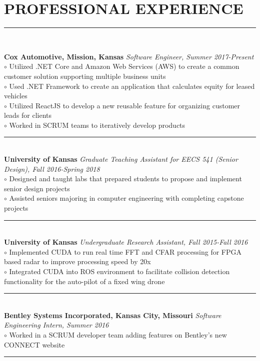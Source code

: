 \documentclass[twoside]{article}
\begin{document}
\section*{PROFESSIONAL EXPERIENCE}
\vspace{-1em}
\rule{\textwidth}{1pt}\\
\begin{adjustwidth}{0.2in}{0in}
\vspace{-1em}
\textbf{Cox Automotive, Mission, Kansas} \hfill \textit{Software Engineer, Summer 2017-Present}\\
$\circ$ Utilized .NET Core and Amazon Web Services (AWS) to create a common customer solution supporting multiple business units\\
$\circ$ Used .NET Framework to create an application that calculates equity for leased vehicles\\
$\circ$ Utilized ReactJS to develop a new reusable feature for organizing customer leads for clients\\
$\circ$ Worked in SCRUM teams to iteratively develop products\\
\rule{7.3in}{0.5pt}\\
\textbf{University of Kansas} \hfill \textit{Graduate Teaching Assistant for EECS 541 (Senior Design), Fall 2016-Spring 2018}\\
$\circ$ Designed and taught labs that prepared students to propose and implement senior design projects\\
$\circ$ Assisted seniors majoring in computer engineering with completing capstone projects\\
\rule{7.3in}{0.5pt}\\
\textbf{University of Kansas} \hfill \textit{Undergraduate Research Assistant, Fall 2015-Fall 2016}\\
$\circ$ Implemented CUDA to run real time FFT and CFAR processing for FPGA based radar to improve processing speed by 20x\\
$\circ$ Integrated CUDA into ROS environment to facilitate collision detection functionality for the auto-pilot of a fixed wing drone\\
\rule{7.3in}{0.5pt}\\
\textbf{Bentley Systems Incorporated, Kansas City, Missouri} \hfill \textit{Software Engineering Intern, Summer 2016}\\
$\circ$ Worked in a SCRUM developer team adding features on Bentley's new CONNECT website\\
\rule{7.3in}{0.5pt}\\

\end{adjustwidth}
\end{document}
